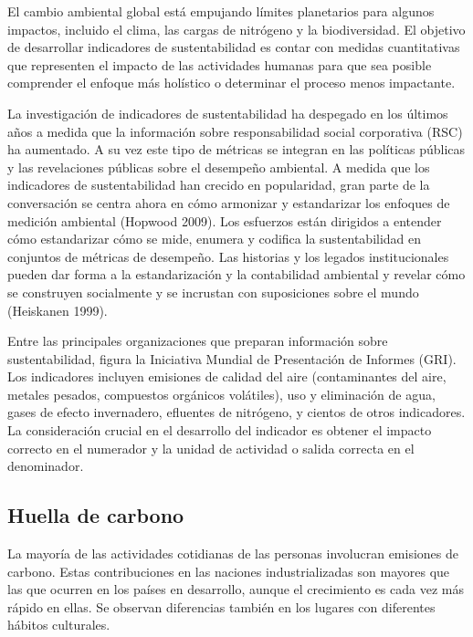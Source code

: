 \documentclass[runningheads]{llncs}
\begin{document}
\bigskip
El cambio ambiental global está empujando límites planetarios para algunos impactos, incluido el clima, las cargas de nitrógeno y la biodiversidad. El objetivo de desarrollar indicadores de sustentabilidad es contar con medidas cuantitativas que representen el impacto de las actividades humanas para que sea posible comprender el enfoque más holístico o determinar el proceso menos impactante.

\bigskip
La investigación de indicadores de sustentabilidad ha despegado en los últimos años a medida que la información sobre responsabilidad social corporativa (RSC) ha aumentado. A su vez este tipo de métricas se integran en las políticas públicas y las revelaciones públicas sobre el desempeño ambiental. A medida que los indicadores de sustentabilidad han crecido en popularidad, gran parte de la conversación se centra ahora en cómo armonizar y estandarizar los enfoques de medición ambiental (Hopwood 2009). Los esfuerzos están dirigidos a entender cómo estandarizar cómo se mide, enumera y codifica la sustentabilidad en conjuntos de métricas de desempeño. Las historias y los legados institucionales pueden dar forma a la estandarización y la contabilidad ambiental y revelar cómo se construyen socialmente y se incrustan con suposiciones sobre el mundo (Heiskanen 1999).

\bigskip
Entre las principales organizaciones que preparan información sobre sustentabilidad, figura la Iniciativa Mundial de Presentación de Informes (GRI). Los indicadores incluyen emisiones de calidad del aire (contaminantes del aire, metales pesados, compuestos orgánicos volátiles), uso y eliminación de agua, gases de efecto invernadero, efluentes de nitrógeno, y cientos de otros indicadores. La consideración crucial en el desarrollo del indicador es obtener el impacto correcto en el numerador y la unidad de actividad o salida correcta en el denominador.

\subsection{Huella de carbono}
\bigskip
La mayoría de las actividades cotidianas de las personas involucran emisiones de carbono. Estas contribuciones en las naciones industrializadas son mayores que las que ocurren en los países en desarrollo, aunque el crecimiento es cada vez más rápido en ellas. Se observan  diferencias también en los lugares con diferentes hábitos culturales.
\end{document}
